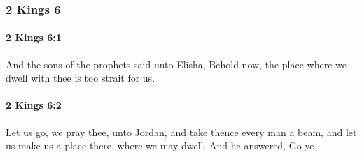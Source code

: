 	\subsubsection{2 Kings 6} %
		\label{2KINGS-6}

		\paragraph{2 Kings 6:1} %
			\label{2KINGS-6-1}

			And the sons of the prophets said unto Elisha, Behold now, the place where we dwell with thee is too strait for us.


		\paragraph{2 Kings 6:2} %
			\label{2KINGS-6-2}

			Let us go, we pray thee, unto Jordan, and take thence every man a beam, and let us make us a place there, where we may dwell. And he answered, Go ye.

